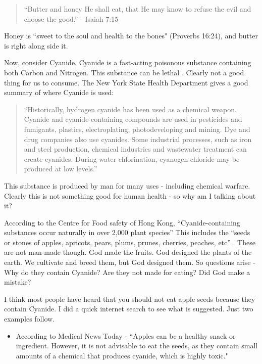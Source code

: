 \documentclass[9.5pt]{article}
\begin{document}
\begin{multicols}{2}
\begin{quotation}
``Butter and honey He shall eat, that He may know to refuse the evil and choose the good.'' - Isaiah 7:15 
\end{quotation}

Honey is ``sweet to the soul and health to the bones" (Proverbs 16:24), and butter is right along side it.

Now, consider Cyanide. Cyanide is a fast-acting poisonous substance containing both Carbon and Nitrogen. This substance can be lethal \cite{The Facts About Cyanides}. Clearly not a good thing for us to consume. The New York State Health Department gives a good summary of where Cyanide is used: 

\begin{quotation}
``Historically, hydrogen cyanide has been used as a chemical weapon. Cyanide and cyanide-containing compounds are used in pesticides and fumigants, plastics, electroplating, photodeveloping and mining. Dye and drug companies also use cyanides. Some industrial processes, such as iron and steel production, chemical industries and wastewater treatment can create cyanides. During water chlorination, cyanogen chloride may be produced at low levels.” \cite{The Facts About Cyanides}
\end{quotation}

This substance is produced by man for many uses - including chemical warfare. Clearly this is not something good for human health - so why am I talking about it? 

According to the Centre for Food safety of Hong Kong, ``Cyanide-containing substances occur naturally in over 2,000 plant species” \cite{Cyanides and Food Safety} This includes the ``seeds or stones of apples, apricots, pears, plums, prunes, cherries, peaches, etc” \cite{Cyanides and Food Safety}. These are not man-made though. God made the fruits. God designed the plants of the earth. We cultivate and breed them, but God designed them. So questions arise - Why do they contain Cyanide? Are they not made for eating? Did God make a mistake?

I think most people have heard that you should not eat apple seeds because they contain Cyanide. I did a quick internet search to see what is suggested. Just two examples follow.

\begin{itemize}
\item According to Medical News Today - ``Apples can be a healthy snack or ingredient. However, it is not advisable to eat the seeds, as they contain small amounts of a chemical that produces cyanide, which is highly toxic." \cite{apple seeds}


\end{itemize}
\end{multicols}
\end{document}
